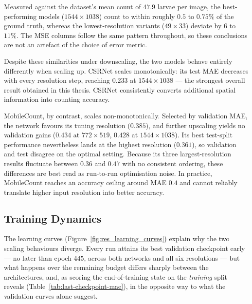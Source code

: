 \documentclass[conference]{IEEEtran}
\begin{document}
Measured against the dataset's mean count of $47.9$ larvae per image, the
best-performing models ($1544\times1038$) count to within roughly $0.5$ to
$0.75\%$ of the ground truth, whereas the lowest-resolution variants
($49\times33$) deviate by $6$ to $11\%$. The MSE columns follow the same
pattern throughout, so these conclusions are not an artefact of the choice of
error metric.

Despite these similarities under downscaling, the two models behave entirely
differently when scaling up. CSRNet scales monotonically: its test MAE
decreases with every resolution step, reaching $0.233$ at
$1544\times1038$ — the strongest overall result obtained in this thesis.
CSRNet consistently converts additional spatial information into counting
accuracy.

MobileCount, by contrast, scales non-monotonically. Selected by validation
MAE, the network favours its tuning resolution ($0.385$), and further
upscaling yields no validation gains ($0.434$ at $772\times519$, $0.428$ at
$1544\times1038$). Its best test-split performance nevertheless lands at the
highest resolution ($0.361$), so validation and test disagree on the optimal
setting. Because its three largest-resolution results fluctuate between
$0.36$ and $0.47$ with no consistent ordering, these differences are best read
as run-to-run optimisation noise. In practice, MobileCount reaches an accuracy
ceiling around MAE $0.4$ and cannot reliably translate higher input resolution
into better accuracy.

\subsection{Training Dynamics}
The learning curves (Figure~\ref{fig:res_learning_curves}) explain why the
two scaling behaviours diverge. Every run attains its best validation
checkpoint early — no later than epoch $445$, across both networks and all six
resolutions — but what happens over the remaining budget differs sharply
between the architectures, and, as scoring the end-of-training state on the
\emph{training} split reveals (Table~\ref{tab:last-checkpoint-mae}), in the
opposite way to what the validation curves alone suggest.
\end{document}
